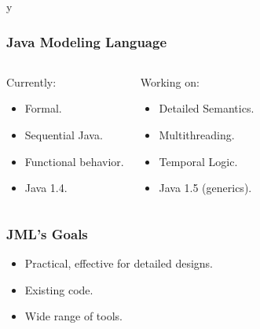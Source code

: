 \if y\MAKEHANDOUTS \documentclass[compress,landscape,handout]{beamer}
\begin{document}
\begin{frame}
\frametitle{Java Modeling Language}
\begin{columns}[t]
\begin{block}{Currently:}
\begin{itemize}
\item
Formal.

\item 
Sequential Java.

\item
Functional behavior.

\item
Java 1.4.
\end{itemize}
\end{block}

\pause

\begin{block}{Working on:}
\begin{itemize}
\item
Detailed Semantics.

\item 
Multithreading.

\item
Temporal Logic.

\item
Java 1.5 (generics).
\end{itemize}
\end{block}
\end{columns}
\end{frame}

\begin{frame}
\frametitle{JML's Goals}
\begin{itemize}
\item
Practical, effective for detailed designs.

\item
Existing code.

\item
Wide range of tools.
\end{itemize}
\end{frame}
\end{document}
